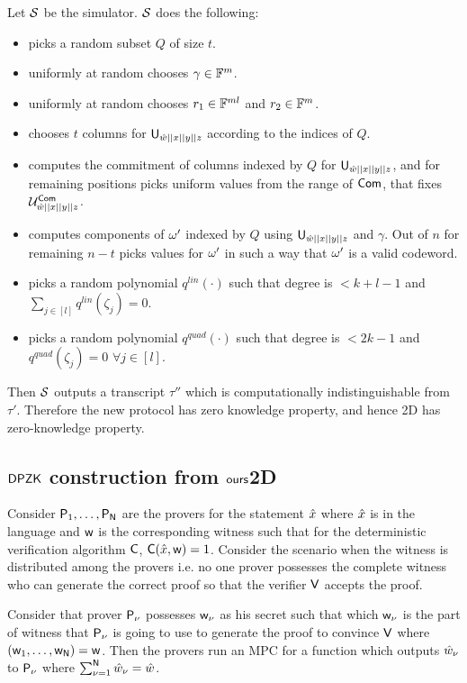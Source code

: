 Let $\mathcal{S}$ be the simulator. $\mathcal{S}$ does the following:
\begin{itemize}
	\item  picks a random subset $Q$ of size $t$.
	\item  uniformly at random chooses $\gamma \in \mathbb{F}^m$.
	\item  uniformly at random chooses $r_1 \in \mathbb{F}^{ml}$ and $r_2 \in \mathbb{F}^m$.
	\item  chooses $t$ columns for $\mathsf{U}_{\hat{w}||x||y||z}$ according to the indices of $Q$.
	\item  computes the commitment of columns indexed by $Q$ for $\mathsf{U}_{\hat{w}||x||y||z}$, and for remaining positions picks uniform values from the range of $\mathsf{Com}$, that fixes $\mathcal{U}^{\mathsf{Com}}_{\hat{w}||x||y||z}$.
	\item  computes components of $\omega'$ indexed by $Q$ using $\mathsf{U}_{\hat{w}||x||y||z}$ and $\gamma$. Out of $n$ for remaining $n-t$ picks values for $\omega'$ in such a way that $\omega'$ is a valid codeword.
	\item  picks a random polynomial $q^{lin}(\cdot)$ such that degree is $<k+l-1$ and $\sum_{j\in [l]} q^{lin}(\zeta_j) = 0$.
	\item  picks a random polynomial $q^{quad}(\cdot)$ such that degree is $<2k-1$ and $q^{quad}(\zeta_j) = 0$ $\forall j\in [l]$.
\end{itemize} 
Then $\mathcal{S}$ outputs a transcript $\tau''$ which is computationally indistinguishable from $\tau'$. Therefore the new protocol has zero knowledge property, and hence \name2D has zero-knowledge property.

\subsection{$\mathsf{DPZK}$ construction from $\textsf{ours}$2D}

Consider $\mathsf{P}_1, \ldots, \mathsf{P}_{\mathsf{N}}$ are the provers for the statement $\hat{x}$ where $\hat{x}$ is in the language and $\mathsf{w}$ is the corresponding witness such that for the deterministic verification algorithm $\mathsf{C}$, $\mathsf{C}(\hat{x}, \mathsf{w})=1$. Consider the scenario when the witness is distributed among the provers i.e. no one prover possesses the complete witness who can generate the correct proof so that the verifier $\mathsf{V}$ accepts the proof.

Consider that prover $\mathsf{P}_{\nu}$ possesses $\mathsf{w}_{\nu}$ as his secret such that which $\mathsf{w}_{\nu}$ is the part of witness that $\mathsf{P}_{\nu}$ is going to use to generate the proof to convince $\mathsf{V}$ where $(\mathsf{w}_1,\ldots, \mathsf{w}_{\mathsf{N}})=\mathsf{w}$. Then the provers run an MPC for a function which outputs $\hat{w}_{\nu}$ to $\mathsf{P}_{\nu}$ where $\sum_{\nu=1}^{\mathsf{N}}\hat{w}_{\nu} = \hat{w}$.

